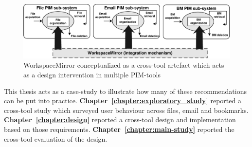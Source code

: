 \begin{figure}[htbp]
	\begin{center}
		\leavevmode
		\includegraphics[width=.9 \textwidth]{pictures/discussion/PIM-cross-tool-artefact.pdf}
	\end{center}
	\caption{WorkspaceMirror conceptualized as a cross-tool artefact which acts as a design intervention in multiple PIM-tools}
	\label{fig:discussion:ct-artefact}
\end{figure}



This thesis acts as a case-study to illustrate how many of these recommendations can be put into practice. \textbf{Chapter~\ref{chapter:exploratory_study}} reported a cross-tool study which surveyed user behaviour across files, email and bookmarks.  \textbf{Chapter~\ref{chapter:design}} reported a cross-tool design and implementation based on those requirements. \textbf{Chapter~\ref{chapter:main-study}} reported the cross-tool evaluation of the design.


